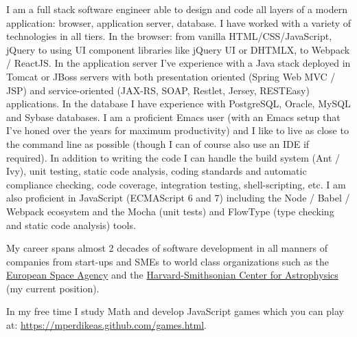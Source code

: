 \documentclass[10pt,a4paper]{article} %
\newcommand\hairspace{\kern .08333em }
\begin{document}
\begin{multicols}{2}  %
  \noindent
  I am a full stack software engineer able to design and code all layers of a modern application: browser, application server, database.
  I have worked with a variety of technologies in all tiers. In the browser: from vanilla HTML/CSS/JavaScript, jQuery to using UI component
  libraries like jQuery UI or DHTMLX, to Webpack / ReactJS. In the application server I've experience with a Java stack
  deployed in Tomcat or JBoss servers with both presentation oriented (Spring Web MVC / JSP) and
  service-oriented (JAX-RS, SOAP, Restlet, Jersey, RESTEasy) applications. In the database I have experience with PostgreSQL, Oracle,
  MySQL and Sybase databases.
  I am a proficient Emacs user (with an Emacs setup that I've honed over the years for maximum productivity)
  and I like to live as close to the command line as possible
  (though I can of course also use an IDE
  if required). In addition to writing the code I can
  handle the build system (Ant / Ivy), unit testing, static code analysis, coding standards and automatic compliance checking,
  code coverage, integration testing, shell-scripting, etc.
  I am also proficient  in JavaScript (ECMAScript 6 and 7) including
  the Node / Babel / Webpack ecosystem and the Mocha (unit tests) and FlowType (type checking and static code analysis) tools.


  My career spans almost 2 decades of software development in all manners of companies
  from start-ups and SMEs to world class organizations
  such as the \href{http://www.esa.int/About_Us/ESAC}{European Space Agency} and the
  \href{https://www.cfa.harvard.edu/}{Harvard-Smithsonian Center for Astrophysics} (my current position).

  In my free time I study Math and develop JavaScript games which you can play at:
  \href{https://mperdikeas.github.com/games.html}{https://mperdikeas.github.com/games.html}.




\end{multicols}

\spacedhrule{0.5em}{-0.4em} %
\end{document}
